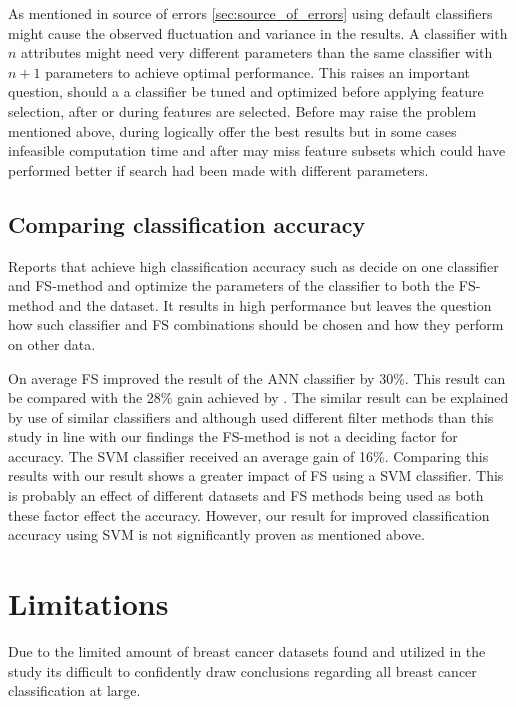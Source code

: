 As mentioned in source of errors \ref{sec:source_of_errors} using default classifiers might cause the observed fluctuation and variance in the results. A classifier with $n$ attributes might need very different parameters than the same classifier with $n + 1$ parameters to achieve optimal performance. This raises an important question, should a a classifier be tuned and optimized before applying feature selection, after or during features are selected. Before may raise the problem mentioned above, during logically offer the best results but in some cases infeasible computation time and after may miss feature subsets which could have performed better if search had been made with different parameters.

\subsection{Comparing classification accuracy}

Reports that achieve high classification accuracy such as \textcite{akay2009} decide on one classifier and FS-method and optimize the parameters of the classifier to both the FS-method and the dataset. It results in high performance but leaves the question how such classifier and FS combinations should be chosen and how they perform on other data.

On average FS improved the result of the ANN classifier by 30\%. This result can be compared with the 28\% gain achieved by \textcite{karabulut2012}. The similar result can be explained by use of similar classifiers and although \textcite{karabulut2012} used different filter methods than this study in line with our findings the FS-method is not a deciding factor for accuracy. The SVM classifier received an average gain of 16\%. Comparing this results with \textcite{b20103177} our result shows a greater impact of FS using a SVM classifier. This is probably an effect of different datasets and FS methods being used as both these factor effect the accuracy. However, our result for improved classification accuracy using SVM is not significantly proven as mentioned above.

\section{Limitations}

Due to the limited amount of breast cancer datasets found and utilized in the study its difficult to confidently draw conclusions regarding all breast cancer classification at large.

